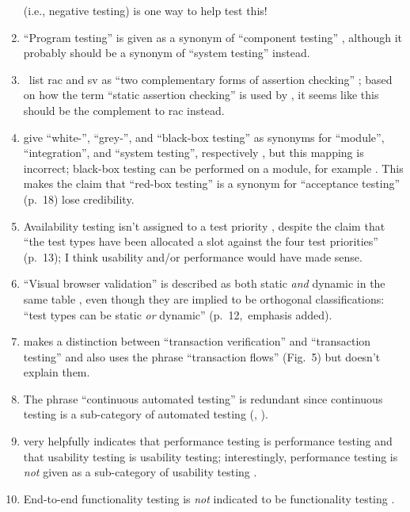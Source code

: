 \begin{enumerate}
             (i.e., negative testing) is one way to help
            test this!
      \item ``Program testing'' is given as a synonym of ``component testing''
            \citep[p.~46]{Kam2008}, although it probably should be a synonym of
            ``system testing'' instead.
      \item \citeauthor{ChalinEtAl2006}~list \acf{rac} and \acf{sv} as ``two
            complementary forms of assertion checking''
            \citeyearpar[p.~343]{ChalinEtAl2006}; based on how the term ``static
            assertion checking'' is used by \citet[p.~345]{LahiriEtAl2013}, it
            seems like this should be the complement to \acs{rac} instead.
      \item \citeauthor{SneedAndGöschl2000} give ``white-'', ``grey-'', and
            ``black-box testing'' as synonyms for ``module'', ``integration'',
            and ``system testing'', respectively
            \citeyearpar[p.~18]{SneedAndGöschl2000} , but
            this mapping is incorrect; black-box testing can be performed on a
            module, for example . This makes the claim that
            ``red-box testing'' is a synonym for ``acceptance testing'' (p.~18)
            lose credibility.
      \item Availability testing isn't assigned to a test priority
            \citep[Tab.~2]{Gerrard2000a}, despite the claim that ``the test
            types have been allocated a slot against
            the four test priorities'' (p.~13); I think usability and/or
            performance would have made sense.
      \item ``Visual browser validation'' is described as both static \emph{and}
            dynamic in the same table \citep[Tab.~2]{Gerrard2000a}, even though
            they are implied to be orthogonal classifications: ``test
            types can be static \emph{or} dynamic'' (p.~12,~emphasis added).
      \item \citeauthor{Gerrard2000a} makes a distinction between ``transaction
            verification'' and ``transaction testing''
            \citeyearpar[Tab.~2]{Gerrard2000a} and also uses the phrase
            ``transaction flows'' (Fig.~5) but doesn't explain them.
      \item The phrase ``continuous automated testing''  \citep[p.~11]{Gerrard2000a}
            is redundant since continuous testing is a sub-category of automated
            testing (\citealp[p.~35]{IEEE2022}, ).
      \item \citeauthor{Gerrard2000a} very helpfully indicates that performance
            testing is performance testing and that usability testing is
            usability testing; interestingly, performance testing is \emph{not}
            given as a sub-category of usability testing
            \citeyearpar[Tab.~2]{Gerrard2000a}.
      \item End-to-end functionality testing is \emph{not} indicated to be
            functionality testing \citep[Tab.~2]{Gerrard2000a}.
\end{enumerate}

